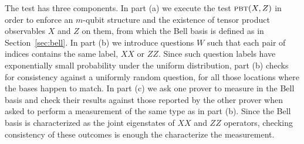 The test has three components. In part (a) we execute the test $\textsc{pbt}(X,Z)$ in order to enforce an $m$-qubit structure and the existence of tensor product observables $X$ and $Z$ on them, from which the Bell basis is defined as in Section~\ref{sec:bell}. In part (b) we introduce questions $W$ such that each pair of indices contains the same label, $XX$ or $ZZ$. Since such question labels have exponentially small probability under the uniform distribution, part (b) checks for consistency against a uniformly random question, for all those locations where the bases happen to match. 
In part (c) we ask one prover to measure in the Bell basis and check their results against those reported by the other prover when asked to perform a measurement of the same type as in part (b). Since the Bell basis is characterized as the joint eigenstates of $XX$ and $ZZ$ operators, checking consistency of these outcomes is enough the characterize the measurement. 



